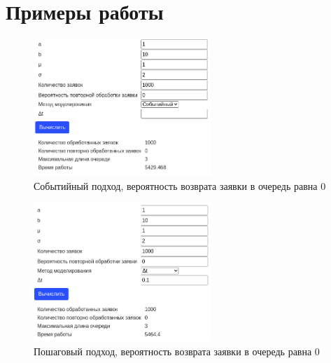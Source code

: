 \chapter{Примеры работы}

\begin{figure}[H]
    \centering
    \includegraphics[width=0.6\textwidth]{images/scr01.png}
    \caption{Событийный подход, вероятность возврата заявки в очередь равна 0}
\end{figure}
\begin{figure}[H]
    \centering
    \includegraphics[width=0.6\textwidth]{images/scr02.png}
    \caption{Пошаговый подход, вероятность возврата заявки в очередь равна 0}
\end{figure}

